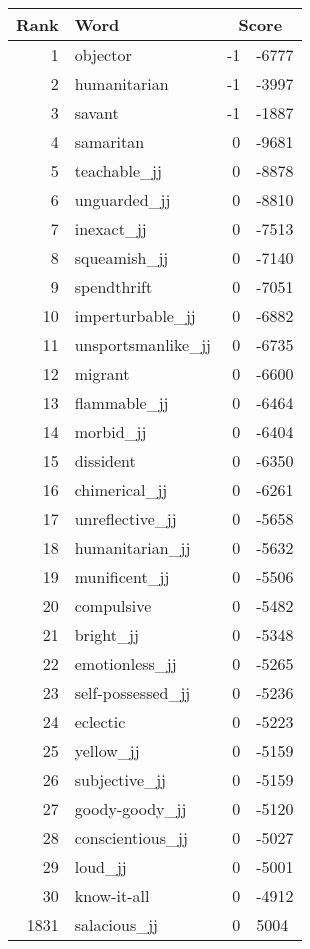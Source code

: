 \begin{longtable}[!htbp]{| rlr@{.}l |}
    \hline
    \textbf{Rank} & \textbf{Word} & \multicolumn{2}{c|}{\textbf{Score}} \\
    \hline
    \endhead
    1 & objector & -1 & -6777 \\
    2 & humanitarian & -1 & -3997 \\
    3 & savant & -1 & -1887 \\
    4 & samaritan & 0 & -9681 \\
    5 & teachable\_jj & 0 & -8878 \\
    6 & unguarded\_jj & 0 & -8810 \\
    7 & inexact\_jj & 0 & -7513 \\
    8 & squeamish\_jj & 0 & -7140 \\
    9 & spendthrift & 0 & -7051 \\
    10 & imperturbable\_jj & 0 & -6882 \\
    11 & unsportsmanlike\_jj & 0 & -6735 \\
    12 & migrant & 0 & -6600 \\
    13 & flammable\_jj & 0 & -6464 \\
    14 & morbid\_jj & 0 & -6404 \\
    15 & dissident & 0 & -6350 \\
    16 & chimerical\_jj & 0 & -6261 \\
    17 & unreflective\_jj & 0 & -5658 \\
    18 & humanitarian\_jj & 0 & -5632 \\
    19 & munificent\_jj & 0 & -5506 \\
    20 & compulsive & 0 & -5482 \\
    21 & bright\_jj & 0 & -5348 \\
    22 & emotionless\_jj & 0 & -5265 \\
    23 & self-possessed\_jj & 0 & -5236 \\
    24 & eclectic & 0 & -5223 \\
    25 & yellow\_jj & 0 & -5159 \\
    26 & subjective\_jj & 0 & -5159 \\
    27 & goody-goody\_jj & 0 & -5120 \\
    28 & conscientious\_jj & 0 & -5027 \\
    29 & loud\_jj & 0 & -5001 \\
    30 & know-it-all & 0 & -4912 \\
    1831 & salacious\_jj & 0 & 5004 \\

\end{longtable}
